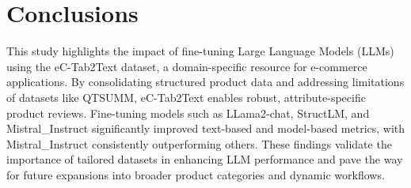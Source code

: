 \section{Conclusions}
This study highlights the impact of fine-tuning Large Language Models (LLMs) using the eC-Tab2Text dataset, a domain-specific resource for e-commerce applications. By consolidating structured product data and addressing limitations of datasets like QTSUMM, eC-Tab2Text enables robust, attribute-specific product reviews. Fine-tuning models such as LLama2-chat, StructLM, and Mistral\_Instruct significantly improved text-based and model-based metrics, with Mistral\_Instruct consistently outperforming others. These findings validate the importance of tailored datasets in enhancing LLM performance and pave the way for future expansions into broader product categories and dynamic workflows. 